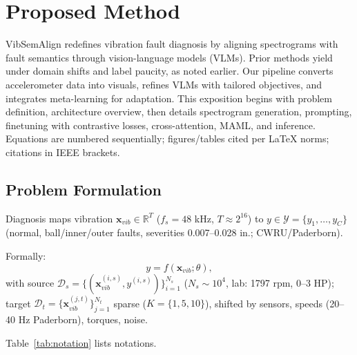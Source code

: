 \section{Proposed Method}

VibSemAlign redefines vibration fault diagnosis by aligning spectrograms with fault semantics through vision-language models (VLMs). Prior methods yield under domain shifts and label paucity, as noted earlier. Our pipeline converts accelerometer data into visuals, refines VLMs with tailored objectives, and integrates meta-learning for adaptation. This exposition begins with problem definition, architecture overview, then details spectrogram generation, prompting, finetuning with contrastive losses, cross-attention, MAML, and inference. Equations are numbered sequentially; figures/tables cited per LaTeX norms; citations in IEEE brackets.

\subsection{Problem Formulation}
\label{subsec:problem_formulation}

Diagnosis maps vibration $\mathbf{x}_{vib} \in \mathbb{R}^{T}$ ($f_s = 48$ kHz, $T \approx 2^{16}$) to $y \in \mathcal{Y} = \{y_1, \dots, y_C\}$ (normal, ball/inner/outer faults, severities 0.007--0.028 in.; CWRU/Paderborn).

Formally:
\begin{equation}
y = f(\mathbf{x}_{vib}; \theta),
\label{eq:f1}
\end{equation}
with source $\mathcal{D}_s = \{(\mathbf{x}_{vib}^{(i,s)}, y^{(i,s)})\}_{i=1}^{N_s}$ ($N_s \sim 10^4$, lab: 1797 rpm, 0--3 HP); target $\mathcal{D}_t = \{\mathbf{x}_{vib}^{(j,t)}\}_{j=1}^{N_t}$ sparse ($K=\{1,5,10\}$), shifted by sensors, speeds (20--40 Hz Paderborn), torques, noise.

Table~\ref{tab:notation} lists notations.


